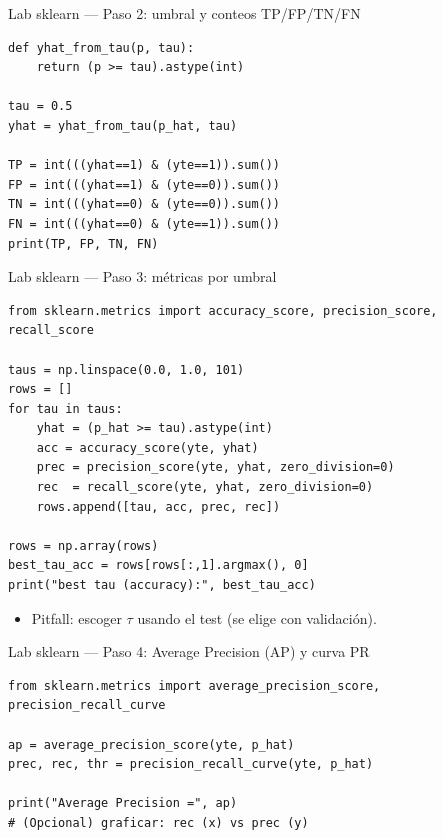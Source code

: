 \begin{frame}[fragile]{Lab sklearn — Paso 2: umbral y conteos TP/FP/TN/FN}

\begin{verbatim}
def yhat_from_tau(p, tau):
    return (p >= tau).astype(int)

tau = 0.5
yhat = yhat_from_tau(p_hat, tau)

TP = int(((yhat==1) & (yte==1)).sum())
FP = int(((yhat==1) & (yte==0)).sum())
TN = int(((yhat==0) & (yte==0)).sum())
FN = int(((yhat==0) & (yte==1)).sum())
print(TP, FP, TN, FN)
\end{verbatim}
\end{frame}

\begin{frame}[fragile]{Lab sklearn — Paso 3: métricas por umbral}

\begin{verbatim}
from sklearn.metrics import accuracy_score, precision_score, recall_score

taus = np.linspace(0.0, 1.0, 101)
rows = []
for tau in taus:
    yhat = (p_hat >= tau).astype(int)
    acc = accuracy_score(yte, yhat)
    prec = precision_score(yte, yhat, zero_division=0)
    rec  = recall_score(yte, yhat, zero_division=0)
    rows.append([tau, acc, prec, rec])

rows = np.array(rows)
best_tau_acc = rows[rows[:,1].argmax(), 0]
print("best tau (accuracy):", best_tau_acc)
\end{verbatim}
\begin{itemize}
  \item Pitfall: escoger \(\tau\) usando el test (se elige con validación).
\end{itemize}
\end{frame}

\begin{frame}[fragile]{Lab sklearn — Paso 4: Average Precision (AP) y curva PR}

\begin{verbatim}
from sklearn.metrics import average_precision_score, precision_recall_curve

ap = average_precision_score(yte, p_hat)
prec, rec, thr = precision_recall_curve(yte, p_hat)

print("Average Precision =", ap)
# (Opcional) graficar: rec (x) vs prec (y)
\end{verbatim}
\end{frame}

